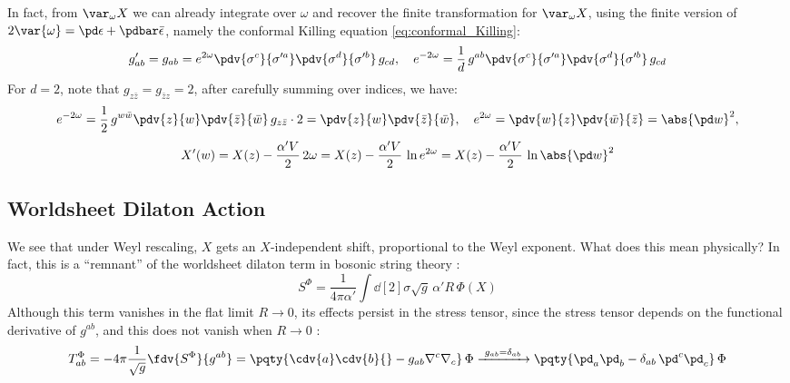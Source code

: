 \documentclass[a4paper
	,10pt
]{article}
\begin{document}
	In fact, from $\var_\omega {X}$ we can already integrate over $\omega$ and recover the finite transformation for $\var_\omega {X}$, using the finite version of $
		2\var{\omega}
		= \pd\epsilon
			+ \pdbar\bar{\epsilon}
	$, namely the conformal Killing equation \eqref{eq:conformal_Killing}:
	\begin{equation}
		g'_{ab}
		= g_{ab}
		= e^{2\omega} \pdv{\sigma^c}{\sigma'^a}
			\pdv{\sigma^d}{\sigma'^b}\,g_{cd},
	\quad
		e^{-2\omega}
		= \frac{1}{d}\,
			g^{ab}
			\pdv{\sigma^c}{\sigma'^a}
			\pdv{\sigma^d}{\sigma'^b}
			\,g_{cd}
	\end{equation}
	For $d = 2$, note that $g_{z\bar{z}} = g_{\bar{z}z} = 2$, after carefully summing over indices, we have:
	\begin{equation}
		e^{-2\omega}
		= \frac{1}{2}\, g^{w\bar{w}}
			\pdv{z}{w}
			\pdv{\bar{z}}{\bar{w}}\,
			g_{z\bar{z}} \cdot 2
		= \pdv{z}{w} \pdv{\bar{z}}{\bar{w}},
	\quad
		e^{2\omega}
		= \pdv{w}{z} \pdv{\bar{w}}{\bar{z}}
		= \abs{\pd w}^2,
	\end{equation}
	\vspace{-.5\baselineskip}
	\begin{equation}
		X'(w)
		= X(z) - \frac{\alpha' V}{2}\, 2\omega
		= X(z) - \frac{\alpha' V}{2}\, \ln e^{2\omega}
		= X(z) - \frac{\alpha' V}{2}\, \ln \abs{\pd w}^2
	\label{eq:finite_Weyl}
	\end{equation}
\subsection{Worldsheet Dilaton Action}
	We see that under Weyl rescaling, $X$ gets an $X$-independent shift, proportional to the Weyl exponent. What does this mean physically? In fact, this is a ``remnant'' of the worldsheet dilaton term in bosonic string theory \cite{Polchinski:1998rq}:
	\begin{equation}
		S^\Phi = \frac{1}{4\pi\alpha'}
			\int \dd[2]{\sigma} \sqrt{g}\,
				\alpha' R\,\Phi(X)
	\end{equation}
	Although this term vanishes in the flat limit $R \to 0$, its effects persist in the stress tensor, since the stress tensor depends on the functional derivative of $g^{ab}$, and this does not vanish when $R \to 0$ \cite{Tong:2009np}:
	\begin{equation}
		T^\Phi_{ab}
		= -4\pi \frac{1}{\sqrt{g}} \fdv{S^\Phi}{g^{ab}}
		= \pqty{
				\cdv{a} \cdv{b} {}
				- g_{ab} \nabla^c \nabla_c
			}\,\Phi
		\xrightarrow{\ g_{ab} = \delta_{ab}\ }
		\pqty{
				\pd_a \pd_b
				- \delta_{ab}\, \pd^c \pd_c
			}\,\Phi
	\end{equation}
	
\end{document}
